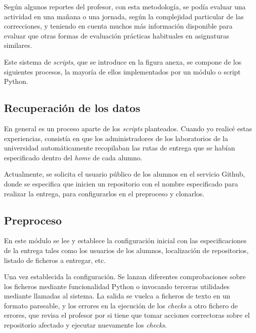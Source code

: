 Según algunos reportes del profesor, con esta metodología, se podía evaluar una actividad en una mañana o una jornada, según la complejidad particular de las correcciones, y teniendo en cuenta muchos más información disponible para evaluar que otras formas de evaluación prácticas habituales en asignaturas similares.


Este sistema de \textit{scripts}, que se introduce en la figura anexa, se compone de los siguientes procesos, la mayoría de ellos implementados por un módulo o script Python.


\subsection{Recuperación de los datos}
\label{sec:rec_datos}


En general es un proceso aparte de los \textit{scripts} planteados. Cuando yo realicé estas experiencias, consistía en que los administradores de los laboratorios de la universidad automáticamente recopilaban las rutas de entrega que se habían especificado dentro del \textit{home} de cada alumno.


Actualmente, se solicita el usuario público de los alumnos en el servicio Github, donde se especifica que inicien un repositorio con el nombre especificado para realizar la entrega, para configurarlos en el preproceso y clonarlos.



\subsection{Preproceso}
\label{sec:preproceso}


En este módulo se lee y establece la configuración inicial con las especificaciones de la entrega tales como los usuarios de los alumnos, localización de repositorios, listado de ficheros a entregar, etc.


Una vez establecida la configuración. Se lanzan diferentes comprobaciones sobre los ficheros mediante funcionalidad Python o invocando terceras utilidades mediante llamadas al sistema. La salida se vuelca a ficheros de texto en un formato parseable, y los errores en la ejecución de los \textit{checks} a otro fichero de errores, que revisa el profesor por si tiene que tomar acciones correctoras sobre el repositorio afectado y ejecutar nuevamente los \textit{checks}.


